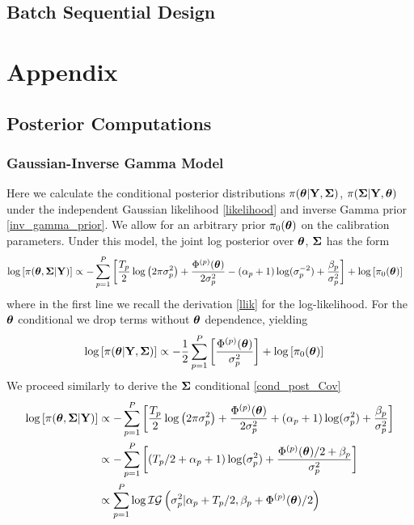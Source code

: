 \documentclass[12pt]{article}
\begin{document}
\subsection{Batch Sequential Design}


\section{Appendix}

\subsection{Posterior Computations}

\subsubsection{Gaussian-Inverse Gamma Model}
Here we calculate the conditional posterior distributions $\pi(\boldsymbol{\theta}|\mathbf{Y}, \boldsymbol{\Sigma})$, $\pi(\boldsymbol{\Sigma}|\mathbf{Y}, \boldsymbol{\theta})$ under the independent Gaussian 
likelihood \ref{likelihood} and inverse Gamma prior \ref{inv_gamma_prior}. We allow for an arbitrary prior $\pi_0(\boldsymbol{\theta})$ on the calibration parameters.
Under this model, the joint log posterior over $\boldsymbol{\theta}$, $\boldsymbol{\Sigma}$ has the form 
\begin{align*}
\log\left[\pi(\boldsymbol{\theta}, \boldsymbol{\Sigma}|\mathbf{Y})\right] &\propto -\sum_{p = 1}^{P} \left[\frac{T_{p}}{2} \log\left(2\pi \sigma_{p}^2 \right) + \frac{\Phi^{(p)}(\boldsymbol{\theta})}{2\sigma_{p}^2}  - (\alpha_{p} + 1)\log(\sigma_{p}^{-2}) + \frac{\beta_{p}}{\sigma_{p}^2} \right] + \log\left[\pi_0(\boldsymbol{\theta})\right] 
\end{align*}
where in the first line we recall the derivation \ref{llik} for the log-likelihood. For the $\boldsymbol{\theta}$ conditional we drop terms without $\boldsymbol{\theta}$ dependence, yielding
\begin{align*}
\log\left[\pi(\boldsymbol{\theta}|\mathbf{Y}, \boldsymbol{\Sigma})\right] &\propto -\frac{1}{2} \sum_{p = 1}^{P} \left[\frac{\Phi^{(p)}(\boldsymbol{\theta})}{\sigma_{p}^2}\right]  + \log\left[\pi_0(\boldsymbol{\theta})\right] 
\end{align*}
We proceed similarly to derive the $\boldsymbol{\Sigma}$ conditional \ref{cond_post_Cov}
\begin{align*}
\log\left[\pi(\boldsymbol{\theta}, \boldsymbol{\Sigma}|\mathbf{Y})\right] &\propto - \sum_{p = 1}^{P} \left[\frac{T_{p}}{2} \log\left(2\pi \sigma_{p}^2 \right) + \frac{\Phi^{(p)}(\boldsymbol{\theta})}{2\sigma_{p}^2}  + (\alpha_{p} + 1)\log(\sigma_{p}^{2}) + \frac{\beta_{p}}{\sigma_{p}^2} \right] \\
&\propto - \sum_{p = 1}^{P} \left[(T_{p}/2 + \alpha_{p} + 1)\log(\sigma_{p}^2) + \frac{\Phi^{(p)}(\boldsymbol{\theta})/2 + \beta_{p}}{\sigma_{p}^2} \right] \\
&\propto \sum_{p = 1}^{P} \log \mathcal{IG}\left(\sigma_{p}^2|\alpha_{p} + T_{p}/2, \beta_{p} + \Phi^{(p)}(\boldsymbol{\theta})/2 \right)
\end{align*}
\end{document}
